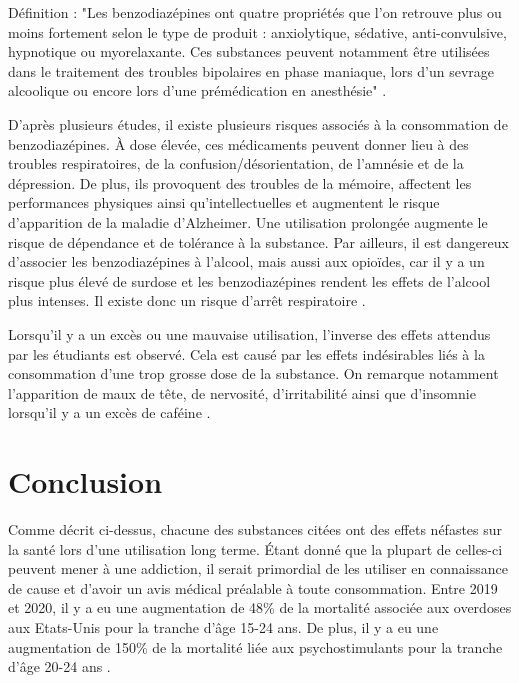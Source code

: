 Définition : "Les benzodiazépines ont quatre propriétés que l'on retrouve
plus ou moins fortement selon le type de produit : anxiolytique, sédative,
anti-convulsive, hypnotique ou myorelaxante. Ces substances peuvent
notamment être utilisées dans le traitement des troubles bipolaires en phase
maniaque, lors d'un sevrage alcoolique ou encore lors d'une prémédication en
anesthésie" \parencite{allo_barrientos_lenjeu_2019}.

D'après plusieurs études, il existe plusieurs risques associés à la consommation de benzodiazépines. À dose élevée, ces médicaments peuvent donner lieu à des troubles respiratoires, de la confusion/désorientation, de l'amnésie et de la dépression. De plus, ils provoquent des troubles de la mémoire, affectent les performances physiques ainsi qu'intellectuelles et augmentent le risque d'apparition de la maladie d'Alzheimer. Une utilisation prolongée augmente le risque de dépendance et de tolérance à la substance. Par ailleurs, il est dangereux d'associer les benzodiazépines à l'alcool, mais aussi aux opioïdes, car il y a un risque plus élevé de surdose et les benzodiazépines rendent les effets de l'alcool plus intenses. Il existe donc un risque d'arrêt respiratoire \parencite{chen_perceptions_2020, sake_benzodiazepine_2019, noauthor_medicaments_nodate}. \newline

Lorsqu'il y a un excès ou une mauvaise utilisation, l'inverse des effets attendus par les étudiants est observé. Cela est causé par les effets indésirables liés à la consommation d'une trop grosse dose de la substance. On remarque notamment l'apparition de maux de tête, de nervosité, d'irritabilité ainsi que d'insomnie lorsqu'il y a un excès de caféine \parencite{ehlers_risk_2019}.

\section{Conclusion}

Comme décrit ci-dessus, chacune des substances citées ont des effets néfastes sur la santé lors d'une utilisation long terme. Étant donné que la plupart de celles-ci peuvent mener à une addiction, il serait primordial de les utiliser en connaissance de cause et d'avoir un avis médical préalable à toute consommation. Entre 2019 et 2020, il y a eu une augmentation de 48\% de la mortalité associée aux overdoses aux Etats-Unis pour la tranche d'âge 15-24 ans. De plus, il y a eu une augmentation de 150\% de la mortalité liée aux psychostimulants pour la tranche d'âge 20-24 ans \parencite{labossier_stimulant_2022,jones_methamphetamine_2022}. \newline

